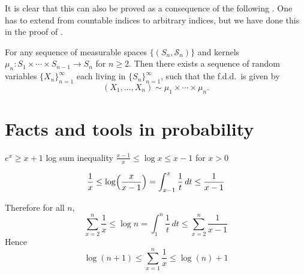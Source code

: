 It is clear that this can also be proved as a consequence of the following . One has to extend from countable indices to arbitrary indices, but we have done this in the proof of .

\cite[Theorem~8.24]{Kallenberg_2021}

\begin{namedthm} \label{thm:ITET}
    For any sequence of measurable spaces $\{(S_n,\mathcal S_n)\}$ and kernels $\mu_n \colon S_1\times \dotsb \times S_{n-1} \to S_n$ for $n \geq 2$. Then there exists a sequence of random variables $\{X_n\}_{n=1}^\infty$ each living in $\{S_n\}_{n=1}^\infty$, such that the f.d.d.\ is given by \[
        (X_1,\dotsc,X_n) \sim \mu_1 \times \dotsb \times \mu_n.
    \]
\end{namedthm}

\begin{namedthm}
    
\end{namedthm}

\section{Facts and tools in probability}
$e^x \geq x + 1$ log sum inequality
$\frac{x-1}{x}\leq \log x \leq x - 1$ for $x > 0$

\[\frac{1}{x}\leq \log\Bigl(\frac{x}{x-1}\Bigr) = \int_{x-1}^x \frac{1}{t}\,dt\leq \frac{1}{x-1}\]

Therefore for all $n$, \[
    \sum_{x=2}^n \frac{1}{x} \leq \log n = \int_1^n \frac{1}{t}\,dt \leq \sum_{x=2}^n \frac{1}{x-1}
\]
Hence \[
    \log(n+1) \leq \sum_{x=1}^n\frac{1}{x}\leq \log(n) +1
\]


\begin{namedthm}
    
\end{namedthm}

